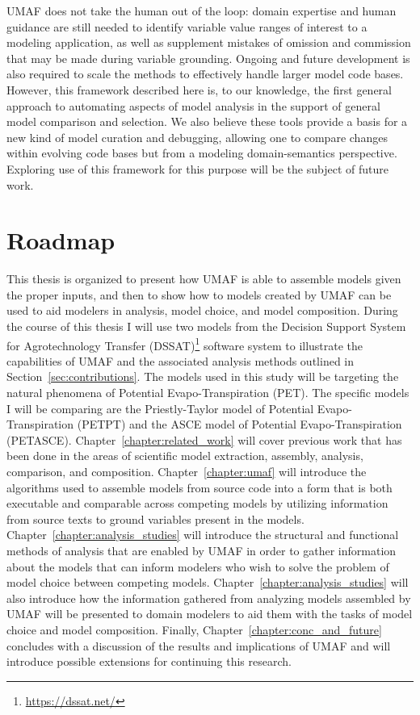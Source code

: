 UMAF does not take the human out of the loop: domain expertise and human guidance are still needed to identify variable value ranges of interest to a modeling application, as well as supplement mistakes of omission and commission that may be made during variable grounding.
Ongoing and future development is also required to scale the methods to effectively handle larger model code bases.
However, this framework described here is, to our knowledge, the first general approach to automating aspects of model analysis in the support of general model comparison and selection.
We also believe these tools provide a basis for a new kind of model curation and debugging, allowing one to compare changes within evolving code bases but from a modeling domain-semantics perspective. Exploring use of this framework for this purpose will be the subject of future work.

\section{Roadmap\label{sec:roadmap}}
This thesis is organized to present how UMAF is able to assemble models given the proper inputs, and then to show how to models created by UMAF can be used to aid modelers in analysis, model choice, and model composition.
During the course of this thesis I will use two models from the Decision Support System for Agrotechnology Transfer (DSSAT)\footnote{\url{https://dssat.net/}} software system \citep{DSSAT} to illustrate the capabilities of UMAF and the associated analysis methods outlined in Section~\ref{sec:contributions}.
The models used in this study will be targeting the natural phenomena of Potential Evapo-Transpiration (PET).
The specific models I will be comparing are the Priestly-Taylor model of Potential Evapo-Transpiration (PETPT) and the ASCE model of Potential Evapo-Transpiration (PETASCE).
Chapter~\ref{chapter:related_work} will cover previous work that has been done in the areas of scientific model extraction, assembly, analysis, comparison, and composition.
Chapter~\ref{chapter:umaf} will introduce the algorithms used to assemble models from source code into a form that is both executable and comparable across competing models by utilizing information from source texts to ground variables present in the models.
Chapter~\ref{chapter:analysis_studies} will introduce the structural and functional methods of analysis that are enabled by UMAF in order to gather information about the models that can inform modelers who wish to solve the problem of model choice between competing models.
Chapter~\ref{chapter:analysis_studies} will also introduce how the information gathered from analyzing models assembled by UMAF will be presented to domain modelers to aid them with the tasks of model choice and model composition.
Finally, Chapter~\ref{chapter:conc_and_future} concludes with a discussion of the results and implications of UMAF and will introduce possible extensions for continuing this research.
